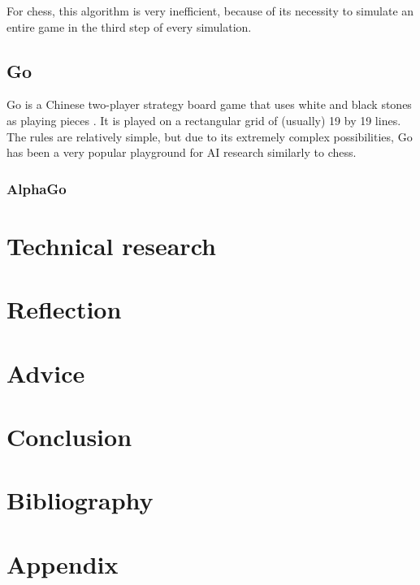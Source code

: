 \documentclass{article}
\begin{document}
For chess, this algorithm is very inefficient, because of its necessity to simulate 
an entire game in the third step of every simulation. 

\subsection{Go}

Go is a Chinese two-player strategy board game that uses white and black stones as playing pieces \cite{GoGame2022}.
It is played on a rectangular grid of (usually) 19 by 19 lines. The rules are relatively simple, but due to 
its extremely complex possibilities, Go has been a very popular playground for AI research similarly to chess.

\subsubsection{AlphaGo}



\newpage
\section{Technical research}

\newpage
\section{Reflection}

\newpage
\section{Advice}

\newpage
\section{Conclusion}

\newpage
\section{Bibliography}
\renewcommand{\bibname}{}
\printbibliography[heading=none]

\newpage
\section{Appendix}
\end{document}
